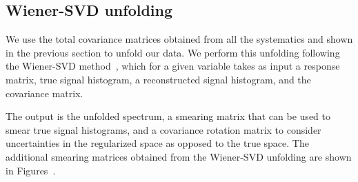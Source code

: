\documentclass{article}
\begin{document}
\clearpage

\subsection{Wiener-SVD unfolding}

We use the total covariance matrices obtained from all the systematics and shown in the previous section
to unfold our data. We perform this unfolding following the Wiener-SVD method~\cite{Tang_2017}, which
for a given variable takes as input a response matrix, true signal histogram, a reconstructed signal histogram, and the 
covariance matrix. 

The output is the unfolded spectrum, a smearing matrix that can be used to smear 
true signal histograms, and a covariance rotation matrix to consider uncertainties in the regularized space as 
opposed to the true space. The additional smearing matrices obtained from the Wiener-SVD unfolding 
are shown in Figures~.
\end{document}
